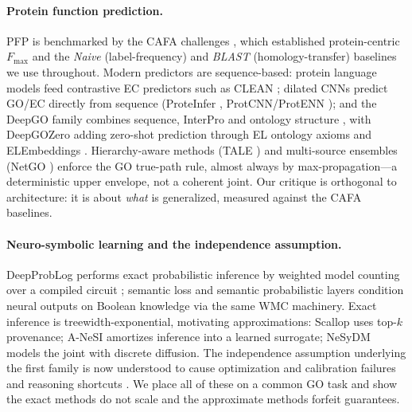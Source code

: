 \documentclass[11pt]{article}
\newcommand{\Fmax}{F_{\max}}
\begin{document}
\paragraph{Protein function prediction.}
PFP is benchmarked by the CAFA challenges \citep{radivojac2013cafa,zhou2019cafa3}, which
established protein-centric $\Fmax$ and the \emph{Naive} (label-frequency) and \emph{BLAST}
(homology-transfer) baselines we use throughout. Modern predictors are sequence-based: protein
language models \citep{rives2021esm1b,lin2023esm2} feed contrastive EC predictors such as CLEAN
\citep{yu2023clean}; dilated CNNs predict GO/EC directly from sequence (ProteInfer
\citep{sanderson2023proteinfer}, ProtCNN/ProtENN \citep{bileschi2022protenn}); and the DeepGO
family combines sequence, InterPro and ontology structure
\citep{kulmanov2018deepgo,kulmanov2020deepgoplus}, with DeepGOZero \citep{kulmanov2022deepgozero}
adding zero-shot prediction through EL ontology axioms and ELEmbeddings
\citep{kulmanov2019elembeddings}. Hierarchy-aware methods (TALE \citep{cao2021tale}) and
multi-source ensembles (NetGO \citep{you2019netgo}) enforce the GO true-path rule, almost always
by max-propagation---a deterministic upper envelope, not a coherent joint. Our critique is
orthogonal to architecture: it is about \emph{what} is generalized, measured against the CAFA
baselines.

\paragraph{Neuro-symbolic learning and the independence assumption.}
DeepProbLog \citep{manhaeve2018deepproblog} performs exact probabilistic inference by weighted
model counting over a compiled circuit \citep{deraedt2007problog}; semantic loss
\citep{xu2018semanticloss} and semantic probabilistic layers \citep{ahmed2022spl} condition
neural outputs on Boolean knowledge via the same WMC machinery. Exact inference is
treewidth-exponential, motivating approximations: Scallop \citep{huang2021scallop,li2023scallop}
uses top-$k$ provenance; A-NeSI \citep{vankrieken2023anesi} amortizes inference into a learned
surrogate; NeSyDM \citep{vankrieken2025nesydm} models the joint with discrete diffusion. The
independence assumption underlying the first family is now understood to cause optimization and
calibration failures and reasoning shortcuts
\citep{vankrieken2024independence,marconato2023reasoningshortcuts,marconato2024bears}. We place all
of these on a common GO task and show the exact methods do not scale and the approximate methods
forfeit guarantees.
\end{document}
